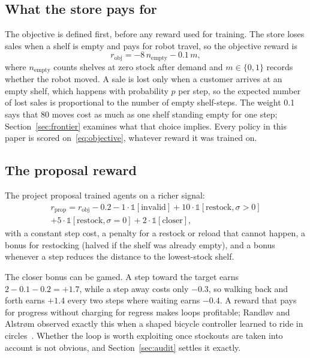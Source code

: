 \subsection{What the store pays for}
The objective is defined first, before any reward used for training. The store loses sales when a shelf is empty and pays for robot travel, so the objective reward is
\begin{equation}
r_{\text{obj}} = -8\,n_{\text{empty}} - 0.1\,m ,
\label{eq:objective}
\end{equation}
where $n_{\text{empty}}$ counts shelves at zero stock after demand and $m\in\{0,1\}$ records whether the robot moved. A sale is lost only when a customer arrives at an empty shelf, which happens with probability $p$ per step, so the expected number of lost sales is proportional to the number of empty shelf-steps. The weight 0.1 says that 80 moves cost as much as one shelf standing empty for one step; Section~\ref{sec:frontier} examines what that choice implies. Every policy in this paper is scored on~\eqref{eq:objective}, whatever reward it was trained on.

\subsection{The proposal reward}
The project proposal trained agents on a richer signal:
\begin{multline}
r_{\text{prop}} = r_{\text{obj}} - 0.2 - 1\cdot\mathbb{1}[\text{invalid}] + 10\cdot\mathbb{1}[\text{restock}, \sigma>0] \\
+ 5\cdot\mathbb{1}[\text{restock}, \sigma=0] + 2\cdot\mathbb{1}[\text{closer}] ,
\label{eq:proposal}
\end{multline}
with a constant step cost, a penalty for a restock or reload that cannot happen, a bonus for restocking (halved if the shelf was already empty), and a bonus whenever a step reduces the distance to the lowest-stock shelf.

The closer bonus can be gamed. A step toward the target earns $2-0.1-0.2=+1.7$, while a step away costs only $-0.3$, so walking back and forth earns $+1.4$ every two steps where waiting earns $-0.4$. A reward that pays for progress without charging for regress makes loops profitable; Randl{\o}v and Alstr{\o}m observed exactly this when a shaped bicycle controller learned to ride in circles~\cite{randlov1998}. Whether the loop is worth exploiting once stockouts are taken into account is not obvious, and Section~\ref{sec:audit} settles it exactly.

